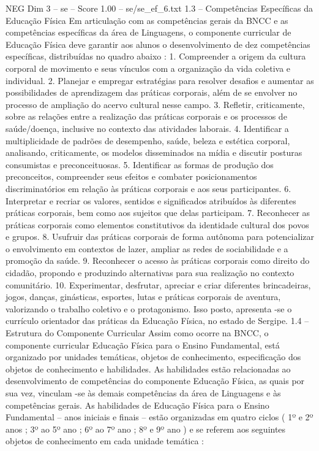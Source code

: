 \begin{textsample}{NEG Dim 3 – se – Score 1.00 – se/se\_ef\_6.txt}  \label{ex:f3_neg_121}
1.3 – Competências Específicas da Educação Física Em articulação com as competências gerais da BNCC e as competências específicas da área de Linguagens, o componente curricular de Educação Física deve garantir aos alunos o desenvolvimento de dez competências específicas, distribuídas no quadro abaixo : 1.
Compreender a origem da cultura corporal de movimento e seus vínculos com a organização da vida coletiva e individual. 2.
Planejar e empregar estratégias para resolver desafios e aumentar as possibilidades de aprendizagem das práticas corporais, além de se envolver no processo de ampliação do acervo cultural nesse campo. 3.
Refletir, criticamente, sobre as relações entre a realização das práticas corporais e os processos de saúde/doença, inclusive no contexto das atividades laborais. 4.
Identificar a multiplicidade de padrões de desempenho, saúde, beleza e estética corporal, analisando, criticamente, os modelos disseminados na mídia e discutir posturas consumistas e preconceituosas. 5.
Identificar as formas de produção dos preconceitos, compreender seus efeitos e combater posicionamentos discriminatórios em relação às práticas corporais e aos seus participantes. 6.
Interpretar e recriar os valores, sentidos e significados atribuídos às diferentes práticas corporais, bem como aos sujeitos que delas participam. 7.
Reconhecer as práticas corporais como elementos constitutivos da identidade cultural dos povos e grupos. 8.
Usufruir das práticas corporais de forma autônoma para potencializar o envolvimento em contextos de lazer, ampliar as redes de sociabilidade e a promoção da saúde. 9.
Reconhecer o acesso às práticas corporais como direito do cidadão, propondo e produzindo alternativas para sua realização no contexto comunitário. 10.
Experimentar, desfrutar, apreciar e criar diferentes brincadeiras, jogos, danças, ginásticas, esportes, lutas e práticas corporais de aventura, valorizando o trabalho coletivo e o protagonismo.
Isso posto, apresenta -se o currículo orientador das práticas da Educação Física, no estado de Sergipe. 1.4 – Estrutura do Componente Curricular Assim como ocorre na BNCC, o componente curricular Educação Física para o Ensino Fundamental, está organizado por unidades temáticas, objetos de conhecimento, especificação dos objetos de conhecimento e habilidades.
As habilidades estão relacionadas ao desenvolvimento de competências do componente Educação Física, as quais por sua vez, vinculam -se às demais competências da área de Linguagens e às competências gerais.
As habilidades de Educação Física para o Ensino Fundamental – anos iniciais e finais – estão organizadas em quatro ciclos ( 1º e 2º anos ; 3º ao 5º ano ; 6º ao 7º ano ; 8º e 9º ano ) e se referem aos seguintes objetos de conhecimento em cada unidade temática :

\end{textsample}
